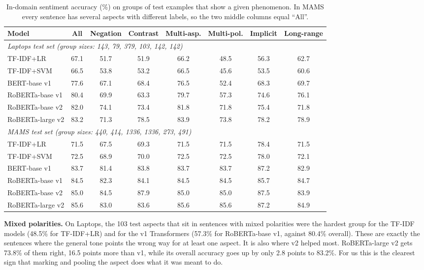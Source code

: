 \documentclass[11pt]{article}
\begin{document}
\begin{table}[t]
\centering
\footnotesize
\begin{tabular}{lccccccc}
\toprule
Model & All & Negation & Contrast & Multi-asp. & Multi-pol. & Implicit & Long-range \\
\midrule
\multicolumn{8}{l}{\textit{Laptops test set (group sizes: 143, 79, 379, 103, 142, 142)}} \\
TF-IDF+LR & 67.1 & 51.7 & 51.9 & 66.2 & 48.5 & 56.3 & 62.7 \\
TF-IDF+SVM & 66.5 & 53.8 & 53.2 & 66.5 & 45.6 & 53.5 & 60.6 \\
BERT-base v1 & 77.6 & 67.1 & 68.4 & 76.5 & 52.4 & 68.3 & 69.7 \\
RoBERTa-base v1 & 80.4 & 69.9 & 63.3 & 79.7 & 57.3 & 74.6 & 76.1 \\
RoBERTa-base v2 & 82.0 & 74.1 & 73.4 & 81.8 & 71.8 & 75.4 & 71.8 \\
RoBERTa-large v2 & 83.2 & 71.3 & 78.5 & 83.9 & 73.8 & 78.2 & 78.9 \\
\multicolumn{8}{l}{\textit{MAMS test set (group sizes: 440, 414, 1336, 1336, 273, 491)}} \\
TF-IDF+LR & 71.5 & 67.5 & 69.3 & 71.5 & 71.5 & 78.4 & 71.5 \\
TF-IDF+SVM & 72.5 & 68.9 & 70.0 & 72.5 & 72.5 & 78.0 & 72.1 \\
BERT-base v1 & 83.7 & 81.4 & 83.8 & 83.7 & 83.7 & 87.2 & 82.9 \\
RoBERTa-base v1 & 84.5 & 82.3 & 84.1 & 84.5 & 84.5 & 85.7 & 84.7 \\
RoBERTa-base v2 & 85.0 & 84.5 & 87.9 & 85.0 & 85.0 & 87.5 & 83.9 \\
RoBERTa-large v2 & 85.6 & 83.0 & 83.6 & 85.6 & 85.6 & 87.2 & 84.9 \\
\bottomrule
\end{tabular}
\caption{In-domain sentiment accuracy (\%) on groups of test examples that show a given phenomenon. In MAMS every sentence has several aspects with different labels, so the two middle columns equal ``All''.}
\label{tab:phen}
\end{table}

\textbf{Mixed polarities.} On Laptops, the 103 test aspects that sit in sentences with mixed polarities were the hardest group for the TF-IDF models (48.5\% for TF-IDF+LR) and for the v1 Transformers (57.3\% for RoBERTa-base v1, against 80.4\% overall). These are exactly the sentences where the general tone points the wrong way for at least one aspect. It is also where v2 helped most. RoBERTa-large v2 gets 73.8\% of them right, 16.5 points more than v1, while its overall accuracy goes up by only 2.8 points to 83.2\%. For us this is the clearest sign that marking and pooling the aspect does what it was meant to do.
\end{document}
